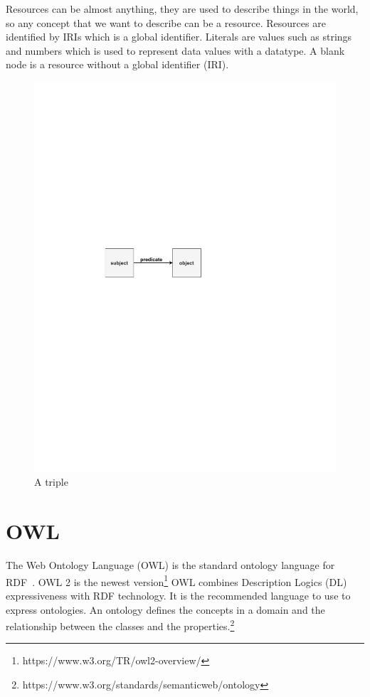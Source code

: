 \documentclass[a4paper,english]{ifimaster/ifimaster}
\begin{document}
Resources can be almost anything, they are used to describe things in the world, so any concept that we want to describe can be a resource. Resources are identified by IRIs which is a global identifier. Literals are values such as strings and numbers which is used to represent data values with a datatype. A blank node is a resource without a global identifier (IRI).~\cite{data_eng_guide} 

\begin{figure}[ht]
    \centering
       \includegraphics[trim=5cm 14cm 9.5cm 12cm]{images/rdf-ex1.pdf}
    \caption{A triple}
    \label{fig:RDF-ex1}
\end{figure}


\section{OWL}
The Web Ontology Language (OWL) is the standard ontology language for RDF~\cite{OWL_W3C}. OWL 2 is the newest version\footnote{https://www.w3.org/TR/owl2-overview/} OWL combines Description Logics (DL) expressiveness with RDF technology. It is the recommended language to use to express ontologies. An ontology defines the concepts in a domain and the relationship between the classes and the properties.\footnote{https://www.w3.org/standards/semanticweb/ontology}
\end{document}
